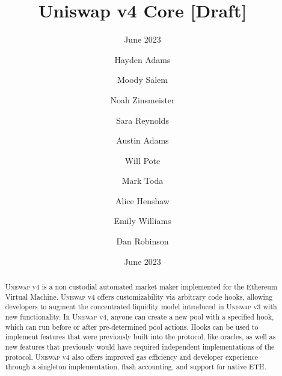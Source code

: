 \documentclass[sigconf,nonacm,prologue,table]{acmart}
\numberwithin{equation}{section}
\theoremstyle{definition}
\theoremstyle{remark}
\begin{document}
\title{Uniswap v4 Core [Draft]}
\subtitle{June 2023}
\date{June 2023}

\author{Hayden Adams}
\affiliation{}

\author{Moody Salem}
\affiliation{}

\author{Noah Zinsmeister}
\affiliation{}

\author{Sara Reynolds}
\affiliation{}

\author{Austin Adams}
\affiliation{}

\author{Will Pote}
\affiliation{}

\author{Mark Toda}
\affiliation{}

\author{Alice Henshaw}
\affiliation{}

\author{Emily Williams}
\affiliation{}

\author{Dan Robinson}
\affiliation{}

\begin{teaserfigure}
\caption*{
    \hspace{\textwidth}
    }
\end{teaserfigure}

\renewcommand{\shortauthors}{Adams et al.}

\begin{abstract}

\textsc{Uniswap v4} is a non-custodial automated market maker implemented for the Ethereum Virtual Machine. \textsc{Uniswap v4} offers customizability via arbitrary code hooks, allowing developers to augment the concentrated liquidity model introduced in \textsc{Uniswap v3} with new functionality. In \textsc{Uniswap v4}, anyone can create a new pool with a specified hook, which can run before or after pre-determined pool actions. Hooks can be used to implement features that were previously built into the protocol, like oracles, as well as new features that previously would have required independent implementations of the protocol. \textsc{Uniswap v4} also offers improved gas efficiency and developer experience through a singleton implementation, flash accounting, and support for native ETH.
\end{abstract}

\maketitle
\end{document}
